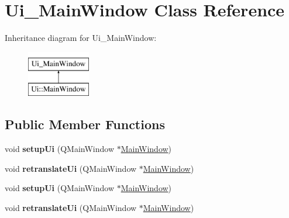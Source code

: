 \hypertarget{classUi__MainWindow}{}\section{Ui\+\_\+\+Main\+Window Class Reference}
\label{classUi__MainWindow}
Inheritance diagram for Ui\+\_\+\+Main\+Window\+:\begin{figure}[H]
\begin{center}
\leavevmode
\includegraphics[height=2.000000cm]{classUi__MainWindow}
\end{center}
\end{figure}
\subsection*{Public Member Functions}
\begin{DoxyCompactItemize}
\item 
\hypertarget{classUi__MainWindow_acf4a0872c4c77d8f43a2ec66ed849b58}{}void {\bfseries setup\+Ui} (Q\+Main\+Window $\ast$\hyperlink{classMainWindow}{Main\+Window})\label{classUi__MainWindow_acf4a0872c4c77d8f43a2ec66ed849b58}

\item 
\hypertarget{classUi__MainWindow_a097dd160c3534a204904cb374412c618}{}void {\bfseries retranslate\+Ui} (Q\+Main\+Window $\ast$\hyperlink{classMainWindow}{Main\+Window})\label{classUi__MainWindow_a097dd160c3534a204904cb374412c618}

\item 
\hypertarget{classUi__MainWindow_acf4a0872c4c77d8f43a2ec66ed849b58}{}void {\bfseries setup\+Ui} (Q\+Main\+Window $\ast$\hyperlink{classMainWindow}{Main\+Window})\label{classUi__MainWindow_acf4a0872c4c77d8f43a2ec66ed849b58}

\item 
\hypertarget{classUi__MainWindow_a097dd160c3534a204904cb374412c618}{}void {\bfseries retranslate\+Ui} (Q\+Main\+Window $\ast$\hyperlink{classMainWindow}{Main\+Window})\label{classUi__MainWindow_a097dd160c3534a204904cb374412c618}

\end{DoxyCompactItemize}
